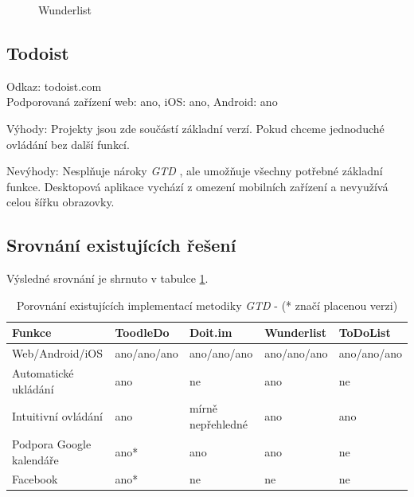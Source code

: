 \documentclass[thesis=B,czech]{FITthesis}[2012/06/26]
\newcommand{\GTD}{\textit{GTD }}
\begin{document}
\begin{figure}[h]
	\caption{Wunderlist \cite{wunderlist_overview}}\label{fig:wunderlist_overview}
\end{figure}

\newpage
	
\subsection{Todoist}

Odkaz: todoist.com\cite{gtd_existing_compare_todolist}\\
Podporovaná zařízení web: ano, iOS: ano, Android: ano

Výhody:
Projekty jsou zde součástí základní verzí. Pokud chceme jednoduché ovládání bez další funkcí.

Nevýhody:
Nesplňuje nároky \GTD, ale umožňuje všechny potřebné základní funkce. 
Desktopová aplikace vychází z omezení mobilních zařízení a nevyužívá celou šířku obrazovky. 

\newpage
\subsection{Srovnání existujících řešení}

Výsledné srovnání je shrnuto v tabulce \ref{tab:gtd_existing_compare}.

\begin{table}[h!]\centering
	\caption{Porovnání existujících implementací metodiky \textit{GTD} - (* značí placenou verzi)}\label{tab:gtd_existing_compare}
	\begin{tabular}{|m{3cm}|m{2cm}|m{2cm}|m{2cm}|m{2cm}|}\hline
		Funkce& ToodleDo		& Doit.im & Wunderlist & ToDoList \tabularnewline \hline \hline
		Web/Android/iOS& ano/ano/ano& ano/ano/ano& ano/ano/ano& ano/ano/ano\tabularnewline \hline				
		Automatické ukládání& ano& ne& ano& ne\tabularnewline \hline
		Intuitivní ovládání& ano& mírně nepřehledné& ano& ano\tabularnewline \hline		
		Podpora Google kalendáře& ano*& ano & ano& ne\tabularnewline \hline	
		Facebook& ano*& ne& ne& ne\tabularnewline \hline				
	\end{tabular}
\end{table}
\end{document}
